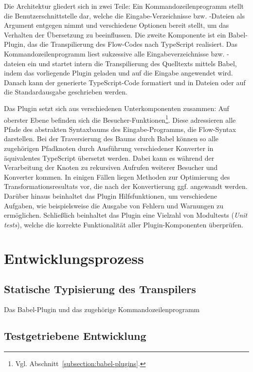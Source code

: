 Die Architektur gliedert sich in zwei Teile: Ein Kommandozeilenprogramm stellt die Benutzerschnittstelle dar, welche die Eingabe-Verzeichnisse bzw. -Dateien als Argument entgegen nimmt und verschiedene Optionen bereit stellt, um das Verhalten der Übersetzung zu beeinflussen. Die zweite Komponente ist ein Babel-Plugin, das die Transpilierung des Flow-Codes nach TypeScript realisiert. Das Kommandozeilenprogramm liest sukzessive alle Eingabeverzeichnisse bzw. -dateien ein und startet intern die Transpilierung des Quelltexts mittels Babel, indem das vorliegende Plugin geladen und auf die Eingabe angewendet wird. Danach kann der generierte TypeScript-Code formatiert und in Dateien oder auf die Standardausgabe geschrieben werden.

Das Plugin setzt sich aus verschiedenen Unterkomponenten zusammen: Auf oberster Ebene befinden sich die Besucher-Funktionen\footnote{Vgl. Abschnitt~\ref{subsection:babel-plugins}.}. Diese adressieren alle Pfade des abstrakten Syntaxbaums des Eingabe-Programms, die Flow-Syntax darstellen. Bei der Traversierung des Baums durch Babel können so alle zugehörigen Pfadknoten durch Ausführung verschiedener Konverter in äquivalentes TypeScript übersetzt werden. Dabei kann es während der Verarbeitung der Knoten zu rekursiven Aufrufen weiterer Besucher und Konverter kommen. In einigen Fällen liegen Methoden zur Optimierung des Transformationsresultats vor, die nach der Konvertierung ggf. angewandt werden. Darüber hinaus beinhaltet das Plugin Hilfsfunktionen, um verschiedene Aufgaben, wie beispielsweise die Ausgabe von Fehlern und Warnungen zu ermöglichen. Schließlich beinhaltet das Plugin eine Vielzahl von Modultests (\textit{Unit tests}), welche die korrekte Funktionalität aller Plugin-Komponenten überprüfen.

\section{Entwicklungsprozess}

\subsection{Statische Typisierung des Transpilers}

Das Babel-Plugin und das zugehörige Kommandozeilenprogramm

\subsection{Testgetriebene Entwicklung}

